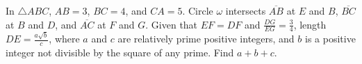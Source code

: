 In $ \triangle ABC $, $ AB = 3 $, $ BC = 4 $, and $ CA = 5 $. Circle $\omega$ intersects $\overline{AB}$ at $E$ and $B$, $\overline{BC}$ at $B$ and $D$, and $\overline{AC}$ at $F$ and $G$. Given that $EF=DF$ and $\tfrac{DG}{EG} = \tfrac{3}{4}$, length $DE=\tfrac{a\sqrt{b}}{c}$, where $a$ and $c$ are relatively prime positive integers, and $b$ is a positive integer not divisible by the square of any prime. Find $a+b+c$.